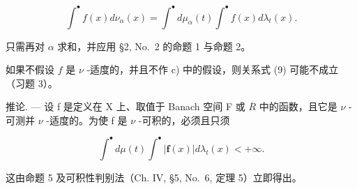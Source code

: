 \[
\int^ {\bullet} f (x) d \nu_ {\alpha} (x) = \int^ {\bullet} d \mu_ {\alpha} (t) \int^ {\bullet} f (x) d \lambda_ {t} (x).
\]

只需再对 \(\alpha\) 求和，并应用 §2, No.~2 的命题 1 与命题 2。

如果不假设 \(f\) 是 \(\nu\) -适度的，并且不作 c) 中的假设，则关系式 (9) 可能不成立（习题 3）。

推论. --- 设 f 是定义在 X 上、取值于 Banach 空间 F 或 \(\overline{R}\) 中的函数，且它是 \(\nu\) -可测并 \(\nu\) -适度的。为使 f 是 \(\nu\) -可积的，必须且只须

\[
\int^ {\bullet} d \mu (t) \int^ {\bullet} | \mathbf {f} (x) | d \lambda_ {t} (x) <   + \infty .
\]

这由命题 5 及可积性判别法（Ch. IV, §5, No.~6, 定理 5）立即得出。

